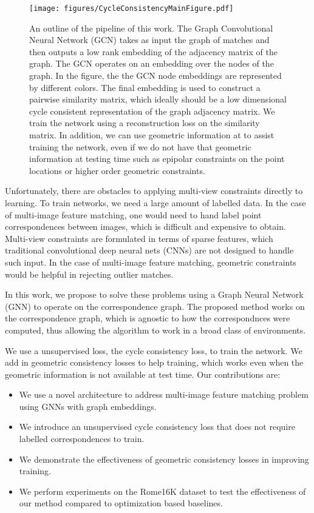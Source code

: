 \documentclass[10pt,twocolumn,letterpaper]{article}
\begin{document}
\begin{figure}[t]
\begin{center}
  \texttt{[image: figures/CycleConsistencyMainFigure.pdf]}
\end{center}
  \caption{
    An outline of the pipeline of this work.
    The Graph Convolutional Neural Network (GCN) \cite{kipf2016semi} takes as input the graph of matches and then outputs a low rank embedding of the adjacency matrix of the graph.
    The GCN operates on an embedding over the nodes of the graph.
    In the figure, the the GCN node embeddings are represented by different colors.
    The final embedding is used to construct a pairwise similarity matrix, which ideally should be a low dimensional cycle consistent representation of the graph adjacency matrix.
    We train the network using a reconstruction loss on the similarity matrix.
    In addition, we can use geometric information at to assist training the network, even if we do not have that geometric information at testing time such as epipolar constraints on the point locations or higher order geometric constraints.
  }
\label{fig:pipeline}
\label{fig:onecol}
\end{figure}

Unfortunately, there are obstacles to applying multi-view constraints directly to learning. 
To train networks, we need a large amount of labelled data.
In the case of multi-image feature matching, one would need to hand label point correspondences between images, which is difficult and expensive to obtain.
Multi-view constraints are formulated in terms of sparse features, which traditional convolutional deep neural nets (CNNs) are not designed to handle such input.
In the case of multi-image feature matching, geometric constraints would be helpful in rejecting outlier matches.

In this work, we propose to solve these problems using a Graph Neural Network (GNN) to operate on the correspondence graph.
The proposed method works on the correspondence graph, which is agnostic to how the correspondnces were computed, thus allowing the algorithm to work in a broad class of environments.

We use a unsupervised loss, the cycle consistency loss, to train the network.
We add in geometric consistency losses to help training, which works even when the geometric information is not available at test time.
Our contributions are:
\begin{itemize}
\item We use a novel architecture to address multi-image feature matching problem using GNNs with graph embeddings.
\item We introduce an unsupervised cycle consistency loss that does not require labelled correspondences to train.
\item We demonstrate the effectiveness of geometric consistency losses in improving training.
\item We perform experiments on the Rome16K \cite{li2010location} dataset to test the effectiveness of our method compared to optimization based baselines.
\end{itemize}
\end{document}
